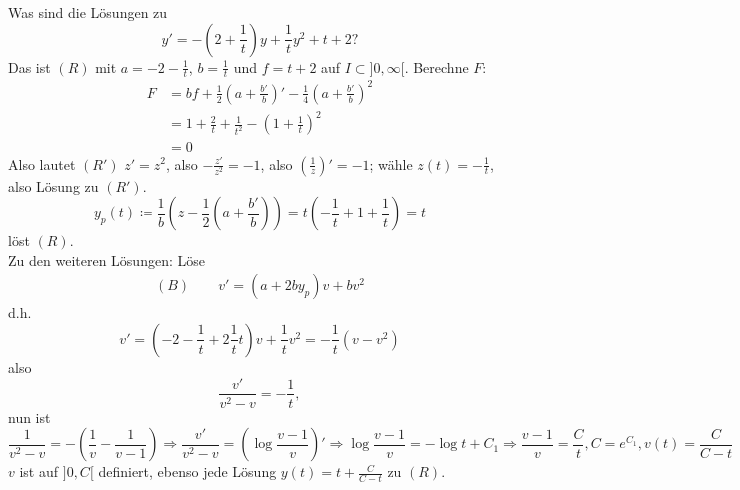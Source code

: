 \begin{beispiel*}
	Was sind die L\"osungen zu \[ y'=-\left(2+\frac{1}{t}\right)y+\frac{1}{t}y^2+t+2? \]
	Das ist $ (R) $ mit $ a=-2-\frac{1}{t} $, $ b=\frac{1}{t} $ und $ f=t+2 $ auf $ I\subset]0,\infty[ $. Berechne $ F: $
	\begin{align*} F&=bf+\frac{1}{2}\left(a+\frac{b'}{b}\right)'-\frac{1}{4}\left(a+\frac{b'}{b}\right)^2\\
	&=1+\frac{2}{t}+\frac{1}{t^2}-\left(1+\frac{1}{t}\right)^2\\
	&=0
	\end{align*}
	Also lautet $ (R') $ $ z'=z^2 $, also $ -\frac{z'}{z^2}=-1 $, also $ \left(\frac{1}{z}\right)'=-1 $; w\"ahle $ z(t)=-\frac{1}{t} $, also L\"osung zu $ (R') $.
	\[ y_p(t)\coloneqq\frac{1}{b}\left(z-\frac{1}{2}\left(a+\frac{b'}{b}\right)\right)=t\left(-\frac{1}{t}+1+\frac{1}{t}\right)=t \]
	l\"ost $ (R) $.\\
	Zu den weiteren L\"osungen: L\"ose
	\begin{align*} (B)\qquad v'=(a+2by_p)v+bv^2 \end{align*}
	d.h.
	\[ v'=\left(-2-\frac{1}{t}+2\frac{1}{t}t\right)v+\frac{1}{t}v^2=-\frac{1}{t}(v-v^2) \]
	also
	\[ \frac{v'}{v^2-v}=-\frac{1}{t}, \]
	nun ist
	\[ \frac{1}{v^2-v}=-\left(\frac{1}{v}-\frac{1}{v-1}\right)\Rightarrow \frac{v'}{v^2-v}=\left(\log\frac{v-1}{v}\right)'\Rightarrow\log\frac{v-1}{v}=-\log t+C_1\Rightarrow\frac{v-1}{v}=\frac{C}{t}, C=e^{C_1}, v(t)=\frac{C}{C-t} \]
	$ v $ ist auf $ ]0,C[ $ definiert, ebenso jede L\"osung $ y(t)=t+\frac{C}{C-t} $ zu $ (R) $.
\end{beispiel*}
